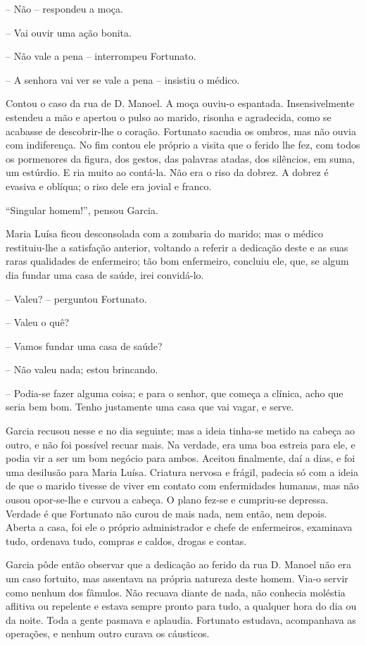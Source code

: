 -- Não -- respondeu a moça.

-- Vai ouvir uma ação bonita.

-- Não vale a pena -- interrompeu Fortunato.

-- A senhora vai ver se vale a pena -- insistiu o médico.

Contou o caso da rua de D. Manoel. A moça ouviu-o espantada.
Insensivelmente estendeu a mão e apertou o pulso ao marido, risonha e
agradecida, como se acabasse de descobrir-lhe o coração. Fortunato
sacudia os ombros, mas não ouvia com indiferença. No fim contou ele
próprio a visita que o ferido lhe fez, com todos os pormenores da
figura, dos gestos, das palavras atadas, dos silêncios, em suma, um
estúrdio. E ria muito ao contá-la. Não era o riso da dobrez. A dobrez é
evasiva e oblíqua; o riso dele era jovial e franco.

``Singular homem!'', pensou Garcia.

Maria Luísa ficou desconsolada com a zombaria do marido; mas o médico
restituiu-lhe a satisfação anterior, voltando a referir a dedicação
deste e as suas raras qualidades de enfermeiro; tão bom enfermeiro,
concluiu ele, que, se algum dia fundar uma casa de saúde, irei
convidá-lo.

-- Valeu? -- perguntou Fortunato.

-- Valeu o quê?

-- Vamos fundar uma casa de saúde?

-- Não valeu nada; estou brincando.

-- Podia-se fazer alguma coisa; e para o senhor, que começa a clínica,
acho que seria bem bom. Tenho justamente uma casa que vai vagar, e
serve.

Garcia recusou nesse e no dia seguinte; mas a ideia tinha-se metido na
cabeça ao outro, e não foi possível recuar mais. Na verdade, era uma boa
estreia para ele, e podia vir a ser um bom negócio para ambos. Aceitou
finalmente, daí a dias, e foi uma desilusão para Maria Luísa. Criatura
nervosa e frágil, padecia só com a ideia de que o marido tivesse de
viver em contato com enfermidades humanas, mas não ousou opor-se-lhe e
curvou a cabeça. O plano fez-se e cumpriu-se depressa. Verdade é que
Fortunato não curou de mais nada, nem então, nem depois. Aberta a casa,
foi ele o próprio administrador e chefe de enfermeiros, examinava tudo,
ordenava tudo, compras e caldos, drogas e contas.

Garcia pôde então observar que a dedicação ao ferido da rua D. Manoel
não era um caso fortuito, mas assentava na própria natureza deste homem.
Via-o servir como nenhum dos fâmulos. Não recuava diante de nada, não
conhecia moléstia aflitiva ou repelente e estava sempre pronto para
tudo, a qualquer hora do dia ou da noite. Toda a gente pasmava e
aplaudia. Fortunato estudava, acompanhava as operações, e nenhum outro
curava os cáusticos.

